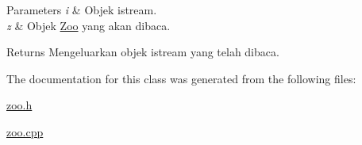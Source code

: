 \begin{DoxyParams}{Parameters}
{\em i} & Objek istream. \\
\hline
{\em z} & Objek \hyperlink{classZoo}{Zoo} yang akan dibaca. \\
\hline
\end{DoxyParams}
\begin{DoxyReturn}{Returns}
Mengeluarkan objek istream yang telah dibaca. 
\end{DoxyReturn}


The documentation for this class was generated from the following files\+:\begin{DoxyCompactItemize}
\item 
\hyperlink{zoo_8h}{zoo.\+h}\item 
\hyperlink{zoo_8cpp}{zoo.\+cpp}\end{DoxyCompactItemize}
